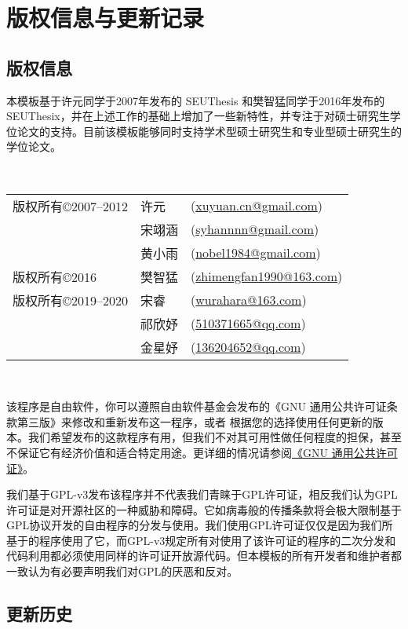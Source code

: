\chapter{版权信息与更新记录}
\label{chp:version_license}

\section{版权信息}

本模板基于许元同学于2007年发布的 SEUThesis 和樊智猛同学于2016年发布的 SEUThesix，并在上述工作的基础上增加了一些新特性，并专注于对硕士研究生学位论文的支持。目前该模板能够同时支持学术型硕士研究生和专业型硕士研究生的学位论文。

~

\begin{tabular}{lll}
版权所有\copyright 2007--2012    & 许元      &(\url{xuyuan.cn@gmail.com})\\
                                & 宋翊涵    &(\url{syhannnn@gmail.com})\\
                                & 黄小雨    &(\url{nobel1984@gmail.com})\\
版权所有\copyright 2016          & 樊智猛    &(\url{zhimengfan1990@163.com})\\
版权所有\copyright 2019--2020    & 宋睿      &(\url{wurahara@163.com})\\
                                & 祁欣妤    &(\url{510371665@qq.com})\\
                                & 金星妤    &(\url{136204652@qq.com})\\
\end{tabular}

~

该程序是自由软件，你可以遵照自由软件基金会发布的《GNU 通用公共许可证条款第三版》来修改和重新发布这一程序，或者 根据您的选择使用任何更新的版本。我们希望发布的这款程序有用，但我们不对其可用性做任何程度的担保，甚至不保证它有经济价值和适合特定用途。更详细的情况请参阅\href{http://www.gnu.org/licenses/gpl.html}{《GNU 通用公共许可证》}。

我们基于GPL-v3发布该程序并不代表我们青睐于GPL许可证，相反我们认为GPL许可证是对开源社区的一种威胁和障碍。它如病毒般的传播条款将会极大限制基于GPL协议开发的自由程序的分发与使用。我们使用GPL许可证仅仅是因为我们所基于的程序使用了它，而GPL-v3规定所有对使用了该许可证的程序的二次分发和代码利用都必须使用同样的许可证开放源代码。但本模板的所有开发者和维护者都一致认为有必要声明我们对GPL的厌恶和反对。

\section{更新历史}

